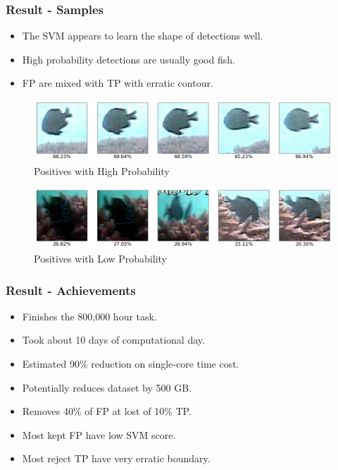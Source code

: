 \documentclass{beamer}[fullspacing]
\begin{document}
\begin{frame}
\frametitle{Result - Samples}

\begin{itemize}
\item
The SVM appears to learn the shape of detections well.
\item
High probability detections are usually good fish.
\item
FP are mixed with TP with erratic contour.
\end{itemize}
\begin{figure}
\setlength{\abovecaptionskip}{-2pt}
\includegraphics[scale=0.25]{image/HP.png}
\caption{Positives with High Probability}
\end{figure}
\vspace{-10pt}
\begin{figure}
\setlength{\abovecaptionskip}{-2pt}
\includegraphics[scale=0.25]{image/LP.png}
\caption{Positives with Low Probability}
\end{figure}

\end{frame}




\begin{frame}
\frametitle{Result - Achievements}

\begin{itemize}
\item
Finishes the 800,000 hour task.
\item
Took about 10 days of computational day.
\item
Estimated 90\% reduction on single-core time cost.
\item
Potentially reduces dataset by 500 GB.
\item 
Removes 40\% of FP at lost of 10\% TP.
\item
Most kept FP have low SVM score.
\item
Most reject TP have very erratic boundary.
\end{itemize}


\end{frame}
\end{document}
